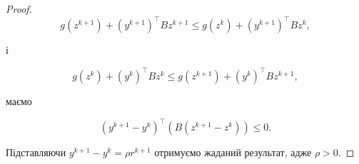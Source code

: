 \begin{proof}
    \begin{equation*}
        g \left( z^{k + 1} \right) + \left( y^{k + 1} \right)^\intercal B z^{k + 1} \le g\left( z^k \right) + \left( y^{k + 1} \right)^\intercal B z^k,
    \end{equation*}

    і

    \begin{equation*}
        g \left( z^k \right) + \left( y^k \right)^\intercal B z^k \le g\left( z^{k + 1} \right) + \left( y^k \right)^\intercal B z^{k + 1},
    \end{equation*}

    маємо

    \begin{equation*}
        \left( y^{k + 1} - y^k \right)^\intercal \left( B \left( z^{k + 1} - z^k \right) \right) \le 0.
    \end{equation*}

    Підставляючи $y^{k + 1} - y^k = \rho r^{k + 1}$ отримуємо жаданий результат, адже $\rho > 0$.
\end{proof}